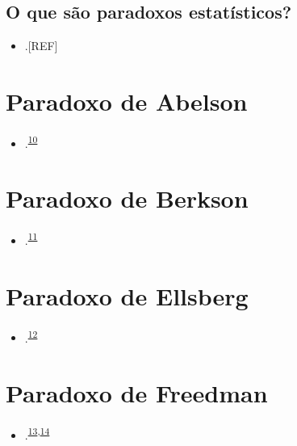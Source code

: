 \documentclass[
  a4paper,
]{book}
\providecommand{\tightlist}{%
  \setlength{\itemsep}{0pt}\setlength{\parskip}{0pt}}
\begin{document}
\hypertarget{o-que-suxe3o-paradoxos-estatuxedsticos}{%
\subsection{O que são paradoxos estatísticos?}\label{o-que-suxe3o-paradoxos-estatuxedsticos}}

\begin{itemize}
\tightlist
\item
  .{[}REF{]}
\end{itemize}

\hypertarget{abelson}{%
\section{Paradoxo de Abelson}\label{abelson}}

\begin{itemize}
\tightlist
\item
  .\textsuperscript{\protect\hyperlink{ref-abelson1985}{10}}
\end{itemize}

\hypertarget{Berkson}{%
\section{Paradoxo de Berkson}\label{Berkson}}

\begin{itemize}
\tightlist
\item
  .\textsuperscript{\protect\hyperlink{ref-berkson1946}{11}}
\end{itemize}

\hypertarget{ellsberg}{%
\section{Paradoxo de Ellsberg}\label{ellsberg}}

\begin{itemize}
\tightlist
\item
  .\textsuperscript{\protect\hyperlink{ref-ellsberg1961}{12}}
\end{itemize}

\hypertarget{freedman}{%
\section{Paradoxo de Freedman}\label{freedman}}

\begin{itemize}
\tightlist
\item
  .\textsuperscript{\protect\hyperlink{ref-freedman1983}{13},\protect\hyperlink{ref-freedman1989}{14}}
\end{itemize}
\end{document}
